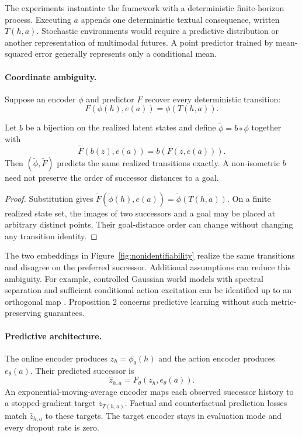 The experiments instantiate the framework with a deterministic finite-horizon process. Executing $a$ appends one deterministic textual consequence, written $T(h,a)$. Stochastic environments would require a predictive distribution or another representation of multimodal futures. A point predictor trained by mean-squared error generally represents only a conditional mean.

\paragraph{Coordinate ambiguity.}
Suppose an encoder $\phi$ and predictor $F$ recover every deterministic transition:
\begin{equation}
    F(\phi(h),e(a))=\phi(T(h,a)).
\end{equation}

\begin{proposition}
Let $b$ be a bijection on the realized latent states and define $\widetilde\phi=b\circ\phi$ together with
\begin{equation}
    \widetilde F(b(z),e(a))=b(F(z,e(a))).
\end{equation}
Then $(\widetilde\phi,\widetilde F)$ predicts the same realized transitions exactly. A non-isometric $b$ need not preserve the order of successor distances to a goal.
\end{proposition}
\begin{proof}
Substitution gives $\widetilde F(\widetilde\phi(h),e(a))=\widetilde\phi(T(h,a))$. On a finite realized state set, the images of two successors and a goal may be placed at arbitrary distinct points. Their goal-distance order can change without changing any transition identity.
\end{proof}

The two embeddings in Figure~\ref{fig:nonidentifiability} realize the same transitions and disagree on the preferred successor. Additional assumptions can reduce this ambiguity. For example, controlled Gaussian world models with spectral separation and sufficient conditional action excitation can be identified up to an orthogonal map \citep{song2026identifiability}. Proposition 2 concerns predictive learning without such metric-preserving guarantees.

\paragraph{Predictive architecture.}
The online encoder produces $z_h=\phi_\theta(h)$ and the action encoder produces $e_\theta(a)$. Their predicted successor is
\begin{equation}
    \widehat z_{h,a}=F_\theta(z_h,e_\theta(a)).
\end{equation}
An exponential-moving-average encoder maps each observed successor history to a stopped-gradient target $\bar z_{T(h,a)}$. Factual and counterfactual prediction losses match $\widehat z_{h,a}$ to these targets. The target encoder stays in evaluation mode and every dropout rate is zero.

